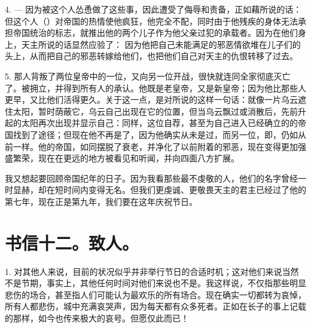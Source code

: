 4. — 因为被这个人怂恿做了这些事，因此遭受了侮辱和责备，正如藉所说的话： 但这个人（）对帝国的热情使他疯狂，他完全不配，同时由于他残疾的身体无法承担帝国统治的标志，就推出他的两个儿子作为他父亲过犯的承载者。因为在他们身上，天主所说的话显然应验了： 因为他把自己未能满足的邪恶情欲堆在儿子们的头上，从而把自己的邪恶转嫁给他们，也把他们自己对天主的仇恨转移了过去。\par

5. 那人背叛了两位皇帝中的一位，又向另一位开战，很快就连同全家彻底灭亡了。被拥立，并得到所有人的承认。他既是老皇帝，又是新皇帝；因为他比那些人更早，又比他们活得更久。关于这一点，是对所说的这样一句话：就像一片乌云遮住太阳，暂时荫蔽它，乌云自己出现在它的位置，但当乌云飘过或消散后，先前升起的太阳再次出现并显示自己：同样，这位自荐，甚至为自己进入已经确立的的帝国找到了途径；但现在他不再是了，因为他确实从未是过，而另一位，即，仍如从前一样。他的帝国，如同摆脱了衰老，并净化了以前附着的邪恶，现在变得更加强盛繁荣，现在在更远的地方被看见和听闻，并向四面八方扩展。\par

我又想起要回顾帝国纪年的日子。因为我看那些最不虔敬的人，他们的名字曾经一时显赫，却在短时间内变得无名。但我们更虔诚、更敬畏天主的君主已经过了他的第七年，现在正是第九年，我们要在这年庆祝节日。\par


\section{书信十二。致人。}

1. 对其他人来说，目前的状况似乎并非举行节日的合适时机；这对他们来说当然不是节期，事实上，其他任何时间对他们来说也不是。我这样说，不仅指那些明显悲伤的场合，甚至指人们可能认为最欢乐的所有场合。现在确实一切都转为哀悼，所有人都悲伤，城中充满哀哭声，因为每天都有众多死者。正如在长子的事上记载的那样，如今也传来极大的哀号。但愿仅此而已！\par

